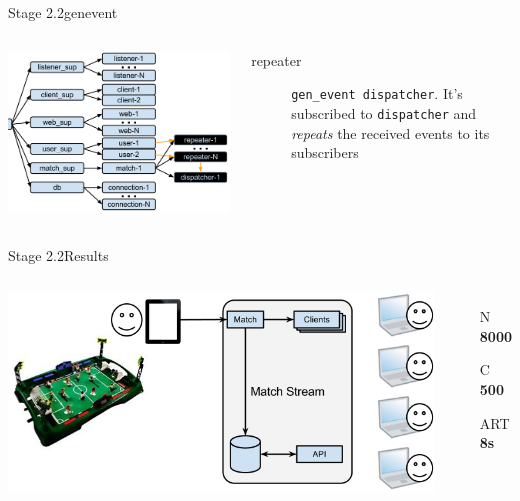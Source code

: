 \documentclass[utf8]{beamer}
\begin{document}
\begin{frame}{Stage 2.2}{gen\textunderscore event}
	\begin{columns}
			\begin{center}
				\includegraphics[height=.75\textheight]{img/architecture-3-2.png}
			\end{center}
			\begin{description}
				\item[repeater]
					\texttt{gen\_event dispatcher}. It's subscribed to \texttt{dispatcher} and \emph{repeats} the received events to its subscribers
			\end{description}
	\end{columns}
\end{frame}
\begin{frame}{Stage 2.2}{Results}
	\begin{columns}
		\column{.66\textwidth}
			\includegraphics[top=-1,width=\textwidth]{img/results-3-2.png}
		\column{.33\textwidth}
			\begin{itemize}
				\item[N] \textbf{\Large 8000}
				\item[C] \textbf{\Large 500}
				\item[ART] \textbf{\Large 8s}
			\end{itemize}
	\end{columns}
\end{frame}
\end{document}
